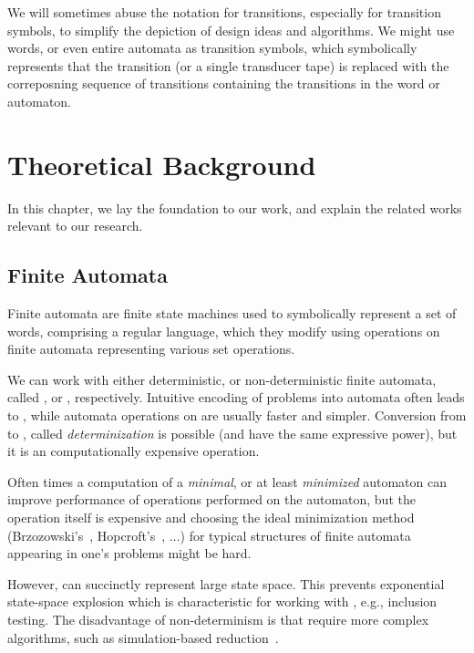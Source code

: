 We will sometimes abuse the notation for transitions, especially for transition symbols, to simplify the depiction of design ideas and algorithms.
We might use words, or even entire automata as transition symbols, which symbolically represents that the transition (or a single transducer tape) is replaced with the correposning sequence of transitions containing the transitions in the word or automaton.

\chapter{Theoretical Background}

In this chapter, we lay the foundation to our work, and explain the related works relevant to our research.

\section{Finite Automata}

Finite automata are finite state machines used to symbolically represent a set of words, comprising a regular language, which they modify using operations on finite automata representing various set operations.

We can work with either deterministic, or non-deterministic finite automata, called \dfa, or \nfa, respectively.
Intuitive encoding of problems into automata often leads to \nfas, while automata operations on \dfas are usually faster and simpler.
Conversion from \nfa to \dfa, called \emph{determinization} is possible (\nfas and \dfas have the same expressive power), but it is an computationally expensive operation.

Often times a computation of a \emph{minimal}, or at least \emph{minimized} automaton can improve performance of operations performed on the automaton, but the operation itself is expensive and choosing the ideal minimization method (Brzozowski's~\cite{Brzozowski1962CanonicalRE}, Hopcroft's~\cite{hopcroft_71}, $\ldots$) for typical structures of finite automata appearing in one's problems might be hard.

However, \nfas can succinctly represent large state space.
This prevents exponential state-space explosion which is characteristic for working with \dfas, e.g., inclusion testing.
The disadvantage of non-determinism is that \nfas require more complex algorithms, such as simulation-based reduction~\cite{ranzato_efficient_2010, holik_optimizing_2009, HHK95}.

